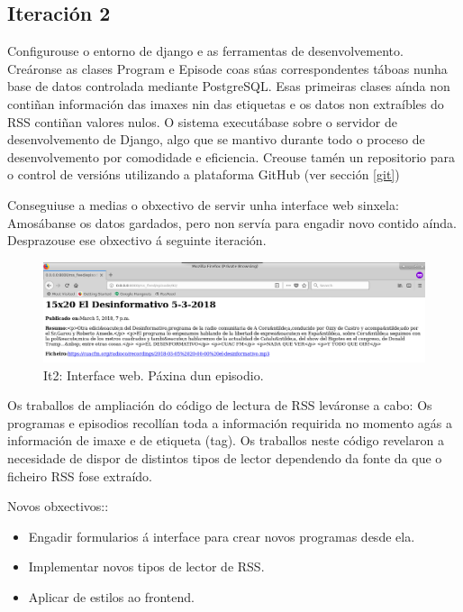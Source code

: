 \subsection{Iteración 2}

Configurouse o entorno de django e as ferramentas de desenvolvemento. Creáronse as clases Program e Episode coas súas correspondentes táboas nunha base de datos controlada mediante PostgreSQL. Esas primeiras clases aínda non contiñan información das imaxes nin das etiquetas e os datos non extraíbles do RSS contiñan valores nulos. O sistema executábase sobre o servidor de desenvolvemento de Django, algo que se mantivo durante todo o proceso de desenvolvemento por comodidade e eficiencia. Creouse tamén un repositorio para o control de versións utilizando a plataforma GitHub (ver sección \ref{git})

Conseguiuse a medias o obxectivo de servir unha interface web sinxela: Amosábanse os datos gardados, pero non servía para engadir novo contido aínda. Desprazouse ese obxectivo á seguinte iteración.

\begin{figure}[h]
	\centering
	\includegraphics[scale=0.3,keepaspectratio=true]{./images/it2_episode.png}
	\caption{It2: Interface web. Páxina dun episodio.}
	\label{fig:it2_episode}
\end{figure}

Os traballos de ampliación do código de lectura de RSS leváronse a cabo: Os programas e episodios recollían toda a información requirida no momento agás a información de imaxe e de etiqueta (tag). Os traballos neste código revelaron a necesidade de dispor de distintos tipos de lector dependendo da fonte da que o ficheiro RSS fose extraído. 

Novos obxectivos:: 

\begin{itemize}
	\item Engadir formularios á interface para crear novos programas desde ela.
	\item Implementar novos tipos de lector de RSS.
	\item Aplicar  de estilos ao frontend. 
\end{itemize}

